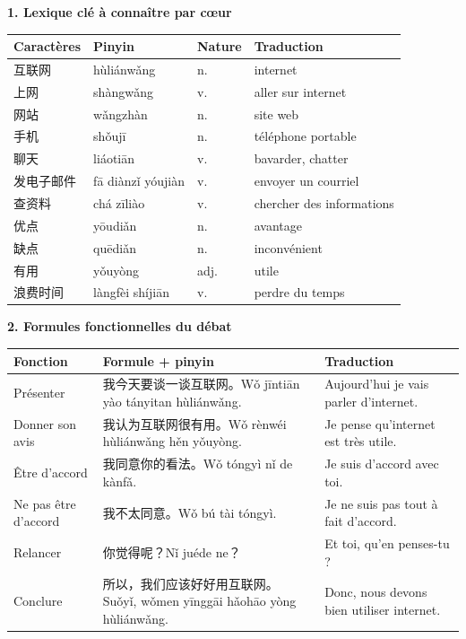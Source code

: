 \documentclass[11pt]{article}
\begin{document}
\begin{bilan}
\textbf{1. Lexique clé à connaître par cœur}
\begin{center}
\begin{tabularx}{\linewidth}{|X|X|X|X|}\hline
\rowcolor{popblueL} Caractères & Pinyin & Nature & Traduction \\ \hline
互联网 & hùliánwǎng & n. & internet \\ \hline
上网 & shàngwǎng & v. & aller sur internet \\ \hline
网站 & wǎngzhàn & n. & site web \\ \hline
手机 & shǒujī & n. & téléphone portable \\ \hline
聊天 & liáotiān & v. & bavarder, chatter \\ \hline
发电子邮件 & fā diànzǐ yóujiàn & v. & envoyer un courriel \\ \hline
查资料 & chá zīliào & v. & chercher des informations \\ \hline
优点 & yōudiǎn & n. & avantage \\ \hline
缺点 & quēdiǎn & n. & inconvénient \\ \hline
有用 & yǒuyòng & adj. & utile \\ \hline
浪费时间 & làngfèi shíjiān & v. & perdre du temps \\ \hline
\end{tabularx}
\end{center}

\textbf{2. Formules fonctionnelles du débat}
\begin{center}
\begin{tabularx}{\linewidth}{|X|X|X|}\hline
\rowcolor{popblueL} Fonction & Formule + pinyin & Traduction \\ \hline
Présenter & 我今天要谈一谈互联网。Wǒ jīntiān yào tányitan hùliánwǎng. & Aujourd'hui je vais parler d'internet. \\ \hline
Donner son avis & 我认为互联网很有用。Wǒ rènwéi hùliánwǎng hěn yǒuyòng. & Je pense qu'internet est très utile. \\ \hline
Être d'accord & 我同意你的看法。Wǒ tóngyì nǐ de kànfǎ. & Je suis d'accord avec toi. \\ \hline
Ne pas être d'accord & 我不太同意。Wǒ bú tài tóngyì. & Je ne suis pas tout à fait d'accord. \\ \hline
Relancer & 你觉得呢？Nǐ juéde ne？ & Et toi, qu'en penses-tu ? \\ \hline
Conclure & 所以，我们应该好好用互联网。Suǒyǐ, wǒmen yīnggāi hǎohāo yòng hùliánwǎng. & Donc, nous devons bien utiliser internet. \\ \hline
\end{tabularx}
\end{center}


\end{bilan}
\end{document}
